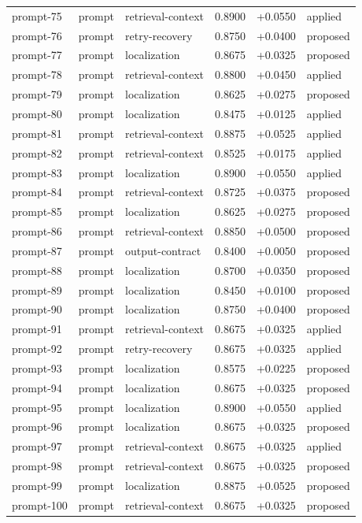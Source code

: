 \begin{center}
\begin{longtable}{llp{5.2cm}rrl}
prompt-75 & prompt & retrieval-context & 0.8900 & +0.0550 & applied \\
prompt-76 & prompt & retry-recovery & 0.8750 & +0.0400 & proposed \\
prompt-77 & prompt & localization & 0.8675 & +0.0325 & proposed \\
prompt-78 & prompt & retrieval-context & 0.8800 & +0.0450 & applied \\
prompt-79 & prompt & localization & 0.8625 & +0.0275 & proposed \\
prompt-80 & prompt & localization & 0.8475 & +0.0125 & applied \\
prompt-81 & prompt & retrieval-context & 0.8875 & +0.0525 & applied \\
prompt-82 & prompt & retrieval-context & 0.8525 & +0.0175 & applied \\
prompt-83 & prompt & localization & 0.8900 & +0.0550 & applied \\
prompt-84 & prompt & retrieval-context & 0.8725 & +0.0375 & proposed \\
prompt-85 & prompt & localization & 0.8625 & +0.0275 & proposed \\
prompt-86 & prompt & retrieval-context & 0.8850 & +0.0500 & proposed \\
prompt-87 & prompt & output-contract & 0.8400 & +0.0050 & proposed \\
prompt-88 & prompt & localization & 0.8700 & +0.0350 & proposed \\
prompt-89 & prompt & localization & 0.8450 & +0.0100 & proposed \\
prompt-90 & prompt & localization & 0.8750 & +0.0400 & proposed \\
prompt-91 & prompt & retrieval-context & 0.8675 & +0.0325 & applied \\
prompt-92 & prompt & retry-recovery & 0.8675 & +0.0325 & applied \\
prompt-93 & prompt & localization & 0.8575 & +0.0225 & proposed \\
prompt-94 & prompt & localization & 0.8675 & +0.0325 & proposed \\
prompt-95 & prompt & localization & 0.8900 & +0.0550 & applied \\
prompt-96 & prompt & localization & 0.8675 & +0.0325 & proposed \\
prompt-97 & prompt & retrieval-context & 0.8675 & +0.0325 & applied \\
prompt-98 & prompt & retrieval-context & 0.8675 & +0.0325 & proposed \\
prompt-99 & prompt & localization & 0.8875 & +0.0525 & proposed \\
prompt-100 & prompt & retrieval-context & 0.8675 & +0.0325 & proposed \\
\bottomrule\end{longtable}\end{center}
\clearpage
